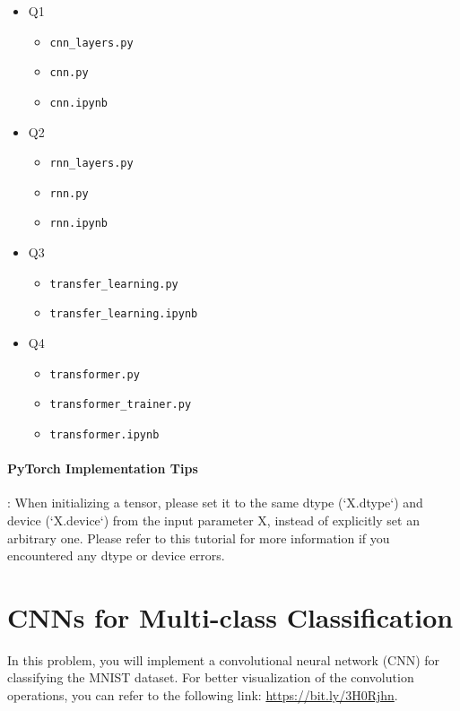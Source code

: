 \documentclass[lang=cn,11pt]{elegantbook}
\begin{document}
\begin{itemize}
    \item Q1
    \begin{itemize}
        \item \texttt{cnn\_layers.py}
        \item \texttt{cnn.py}
        \item \texttt{cnn.ipynb}
    \end{itemize}
    \item Q2
    \begin{itemize}
        \item \texttt{rnn\_layers.py}
        \item \texttt{rnn.py}
        \item \texttt{rnn.ipynb}
    \end{itemize}
    \item Q3
    \begin{itemize}
        \item \texttt{transfer\_learning.py}
        \item \texttt{transfer\_learning.ipynb}
    \end{itemize}
    \item Q4
    \begin{itemize}
        \item \texttt{transformer.py}
        \item \texttt{transformer\_trainer.py}
        \item \texttt{transformer.ipynb}
    \end{itemize}
\end{itemize}

\paragraph*{PyTorch Implementation Tips}: When initializing a tensor, please set it to the same dtype (`X.dtype`) and device (`X.device`) from the input parameter X, instead of explicitly set an arbitrary one. Please refer to this tutorial for more information if you encountered any dtype or device errors.





\section{CNNs for Multi-class Classification}

In this problem, you will implement a convolutional neural network (CNN) for classifying the MNIST dataset. For better visualization of the convolution operations, you can refer to the following link: \url{https://bit.ly/3H0Rjhn}.
\end{document}
